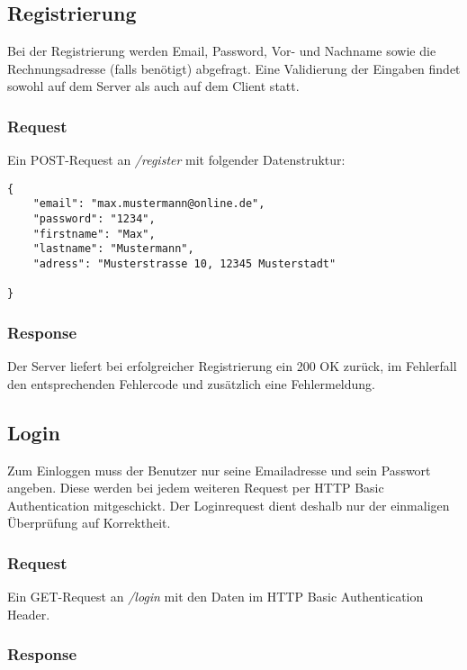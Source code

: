 \documentclass[ngerman]{scrartcl}
\begin{document}
	\subsection{Registrierung}
	
	Bei der Registrierung werden Email, Password, Vor- und Nachname sowie die Rechnungsadresse (falls benötigt) abgefragt. 
	Eine Validierung der Eingaben findet sowohl auf dem Server als auch auf dem Client statt.
	
		\subsubsection*{Request}
		
		Ein POST-Request an \textit{/register} mit folgender Datenstruktur:
		
		\begin{lstlisting}
{
	"email": "max.mustermann@online.de",
	"password": "1234",
	"firstname": "Max",
	"lastname": "Mustermann",
	"adress": "Musterstrasse 10, 12345 Musterstadt"
	
}
		\end{lstlisting}
		
		\subsubsection*{Response}
		
		Der Server liefert bei erfolgreicher Registrierung ein 200 OK zurück, im Fehlerfall den entsprechenden Fehlercode und zusätzlich eine Fehlermeldung.
		
	\subsection{Login}
	
	Zum Einloggen muss der Benutzer nur seine Emailadresse und sein Passwort angeben.
	Diese werden bei jedem weiteren Request per HTTP Basic Authentication mitgeschickt.
	Der Loginrequest dient deshalb nur der einmaligen Überprüfung auf Korrektheit.
	
		\subsubsection*{Request}
		
		Ein GET-Request an \textit{/login} mit den Daten im HTTP Basic Authentication Header.
		
		\subsubsection*{Response}
		
\end{document}
